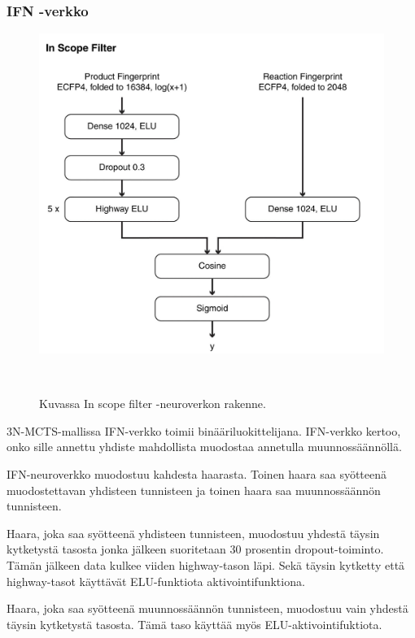 \documentclass[finnish,twoside,censored,tkt,sw-line]{HYthesisML}
\begin{document}
\subsubsection{IFN -verkko}

\begin{figure}[!ht]
    \centering
    \includegraphics[]{in-scope-filter.jpg}
    \caption{Kuvassa In scope filter -neuroverkon rakenne.}
    {~\cite{SeglerMarwinHS2018Pcsw}}
    \label{fig:3n-mcts-ifn}
\end{figure}

3N-MCTS-mallissa IFN-verkko toimii binääriluokittelijana.
IFN-verkko kertoo, onko sille annettu yhdiste mahdollista muodostaa annetulla muunnossäännöllä.

IFN-neuroverkko muodostuu kahdesta haarasta.
Toinen haara saa syötteenä muodostettavan yhdisteen tunnisteen ja toinen haara saa muunnossäännön tunnisteen.

Haara, joka saa syötteenä yhdisteen tunnisteen, muodostuu yhdestä täysin kytketystä tasosta jonka jälkeen suoritetaan 30 prosentin dropout-toiminto.
Tämän jälkeen data kulkee viiden highway-tason läpi.
Sekä täysin kytketty että highway-tasot käyttävät ELU-funktiota aktivointifunktiona.

Haara, joka saa syötteenä muunnossäännön tunnisteen, muodostuu vain yhdestä täysin kytketystä tasosta.
Tämä taso käyttää myös ELU-aktivointifuktiota.
\end{document}
